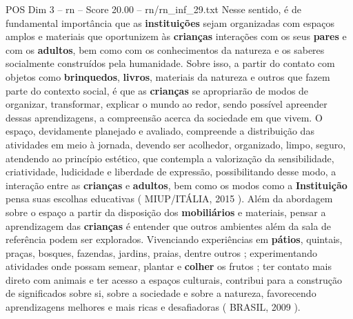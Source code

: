 \begin{textsample}{POS Dim 3 – rn – Score 20.00 – rn/rn\_inf\_29.txt}
Nesse sentido, é de fundamental importância que as \textbf{instituições} sejam organizadas com espaços amplos e materiais que oportunizem às \textbf{crianças} interações com os seus \textbf{pares} e com os \textbf{adultos}, bem como com os conhecimentos da natureza e os saberes socialmente construídos pela humanidade.
Sobre isso, a partir do contato com objetos como \textbf{brinquedos}, \textbf{livros}, materiais da natureza e outros que fazem parte do contexto social, é que as \textbf{crianças} se apropriarão de modos de organizar, transformar, explicar o mundo ao redor, sendo possível apreender dessas aprendizagens, a compreensão acerca da sociedade em que vivem.
O espaço, devidamente planejado e avaliado, compreende a distribuição das atividades em meio à jornada, devendo ser acolhedor, organizado, limpo, seguro, atendendo ao princípio estético, que contempla a valorização da sensibilidade, criatividade, ludicidade e liberdade de expressão, possibilitando desse modo, a interação entre as \textbf{crianças} e \textbf{adultos}, bem como os modos como a \textbf{Instituição} pensa suas escolhas educativas ( MIUP/ITÁLIA, 2015 ).
Além da abordagem sobre o espaço a partir da disposição dos \textbf{mobiliários} e materiais, pensar a aprendizagem das \textbf{crianças} é entender que outros ambientes além da sala de referência podem ser explorados.
Vivenciando experiências em \textbf{pátios}, quintais, praças, bosques, fazendas, jardins, praias, dentre outros ; experimentando atividades onde possam semear, plantar e \textbf{colher} os frutos ; ter contato mais direto com animais e ter acesso a espaços culturais, contribui para a construção de significados sobre si, sobre a sociedade e sobre a natureza, favorecendo aprendizagens melhores e mais ricas e desafiadoras ( BRASIL, 2009 ).

\end{textsample}
